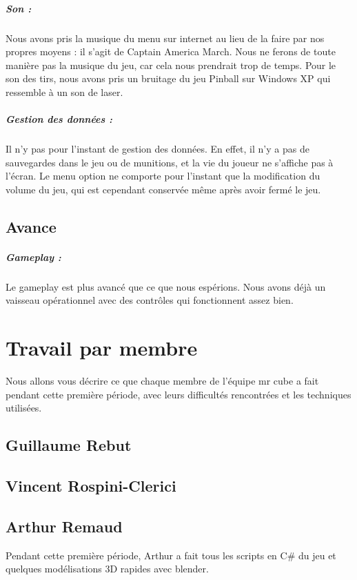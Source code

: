 \documentclass[10pt, titlepage]{report}
\begin{document}
\paragraph{Son :}
Nous avons pris la musique du menu sur internet au lieu de la faire par nos propres moyens : il s'agit de Captain America March. Nous ne ferons de toute manière pas la musique du jeu, car cela nous prendrait trop de temps. Pour le son des tirs, nous avons pris un bruitage du jeu Pinball sur Windows XP qui ressemble à un son de laser.

\paragraph{Gestion des données :}
Il n'y pas pour l'instant de gestion des données. En effet, il n'y a pas de sauvegardes dans le jeu ou de munitions, et la vie du joueur ne s'affiche pas à l'écran. Le menu option ne comporte pour l'instant que la modification du volume du jeu, qui est cependant conservée même après avoir fermé le jeu.

\section{Avance}

\paragraph{Gameplay :}
Le gameplay est plus avancé que ce que nous espérions. Nous avons déjà un vaisseau opérationnel avec des contrôles qui fonctionnent assez bien.

\chapter{Travail par membre}
Nous allons vous décrire ce que chaque membre de l'équipe mr cube a fait pendant cette première période, avec leurs difficultés rencontrées et les techniques utilisées.

\section{Guillaume Rebut}

\section{Vincent Rospini-Clerici}

\section{Arthur Remaud}
Pendant cette première période, Arthur a fait tous les scripts en C\# du jeu et quelques modélisations 3D rapides avec blender.
\end{document}
